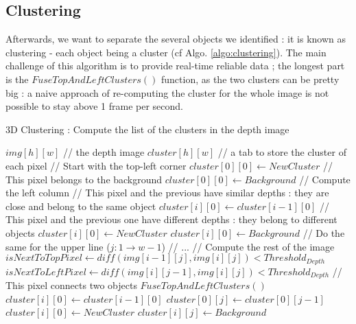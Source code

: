 \documentclass[smallextended]{svjour3}
\begin{document}
\subsection{Clustering}
 Afterwards, we want to separate the several objects we identified : it is known as clustering - each object being a cluster (cf Algo. \ref{algo:clustering}). The main challenge of this algorithm is to provide real-time reliable data ; the longest part is the $FuseTopAndLeftClusters()$ function, as the two clusters can be pretty big : a naive approach of re-computing the cluster for the whole image is not possible to stay above 1 frame per second.

\begin{algorithm}[H]
\caption{\label{algo:clustering}3D Clustering : Compute the list of the clusters in the depth image}
\begin{algorithmic}
\REQUIRE $img[h][w]$ // the depth image
\STATE $cluster[h][w]$  // a tab to store the cluster of each pixel
\STATE 
\STATE // Start with the top-left corner
\STATE $cluster[0][0] \leftarrow NewCluster$
\ELSE
\STATE // This pixel belongs to the background
\STATE $cluster[0][0] \leftarrow Background$
\ENDIF
\STATE 
\STATE // Compute the left column
\STATE // This pixel and the previous have similar depths : they are close and belong to the same object
\STATE $cluster[i][0] \leftarrow cluster[i-1][0]$
\ELSE
\STATE // This pixel and the previous one have different depths : they belong to different objects
\STATE $cluster[i][0] \leftarrow NewCluster$
\ENDIF
\ELSE
\STATE $cluster[i][0] \leftarrow Background$
\ENDIF
\ENDFOR
\STATE 
\STATE // Do the same for the upper line ($j:1 \rightarrow w-1$)
\STATE // ...
\STATE 
\STATE // Compute the rest of the image
\STATE $isNextToTopPixel \leftarrow diff(img[i-1][j], img[i][j]) < Threshold_{Depth}$
\STATE $isNextToLeftPixel \leftarrow diff(img[i][j-1], img[i][j]) < Threshold_{Depth}$
\STATE // This pixel connects two objects
\STATE $FuseTopAndLeftClusters()$
\STATE $cluster[i][0] \leftarrow cluster[i-1][0]$
\STATE $cluster[0][j] \leftarrow cluster[0][j-1]$
\ELSE
\STATE $cluster[i][0] \leftarrow NewCluster$
\ENDIF
\ELSE
\STATE $cluster[i][j] \leftarrow Background$
\ENDIF
\ENDFOR
\ENDFOR
\end{algorithmic}
\end{algorithm}
\end{document}
